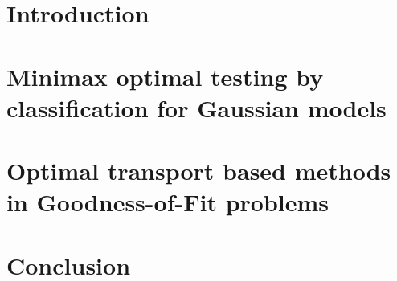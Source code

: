 \documentclass{report}
\date{\today}
\begin{document}
\hypersetup{pageanchor=false} 


\clearpage
\thispagestyle{empty}
\tableofcontents

\clearpage
\hypersetup{pageanchor=true} %
\setcounter{page}{1}

\chapter{Introduction}


\chapter{Minimax optimal testing by classification for Gaussian models}


\chapter{Optimal transport based methods in Goodness-of-Fit problems}


\chapter{Conclusion}



\clearpage


\end{document}
